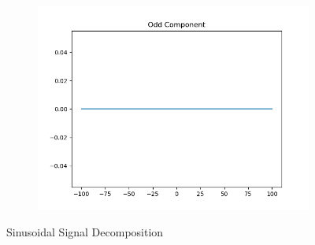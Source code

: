\documentclass[10pt,a4paper, margin=1in]{article}
\begin{document}
\begin{enumerate}
\begin{enumerate}
\begin{figure}[H]
\begin{subfigure}[t]{0.3\linewidth}
        \includegraphics[width=1\linewidth]{assets/q7a/sine_part_a_odd.png}
    \end{subfigure}
    \caption{Sinusoidal Signal Decomposition}
\end{figure}


\end{enumerate}
\end{enumerate}
\end{document}
